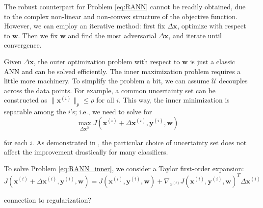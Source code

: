 \documentclass[twoside,12pt]{article}
\newcommand{\M}[1]{\boldsymbol{\mathbf{#1}}}
\newcommand{\Cal}{\mathcal}
\begin{document}
The robust counterpart for Problem \eqref{eq:RANN} cannot be readily obtained, due to the complex non-linear and non-convex structure of the objective function. However, we can employ an iterative method: first fix $\Delta \M x$, optimize with respect to $\M w$. Then we fix $\M w$ and find the most adversarial $\Delta \M x$, and iterate until convergence.

Given $\Delta \M x$, the outer optimization problem with respect to $\M w$ is just a classic ANN and can be solved efficiently. The inner maximization problem requires a little more machinery. To simplify the problem a bit, we can assume $\Cal U$ decouples across the data points. For example, a common uncertainty set can be constructed as $\| \M x^{(i)} \|_p \leq \rho$ for all $i$. This way, the inner minimization is separable among the $i$'s; i.e., we need to solve for 
\begin{equation}\label{eq:RANN_inner}
\max_{\Delta \M x^{(i}}  J(\M x^{(i)} + \Delta \M x^{(i)}, \M y^{(i)}, \M w)
\end{equation}

for each $i$. As demonstrated in \cite{bertsimas2015robust}, the particular choice of uncertainty set does not affect the improvement drastically for many classifiers.

To solve Problem \eqref{eq:RANN_inner}, we consider a Taylor first-order expansion:
\begin{equation}\label{eq:RANN_taylor}
J(\M x^{(i)} + \Delta \M x^{(i)}, \M y^{(i)}, \M w) = J(\M x^{(i)}, \M y^{(i)}, \M w) + \nabla_{x^{(i)}} J(\M x^{(i)}, \M y^{(i)}, \M w) ^T \Delta \M x^{(i)}
\end{equation}



connection to regularization?
\end{document}
